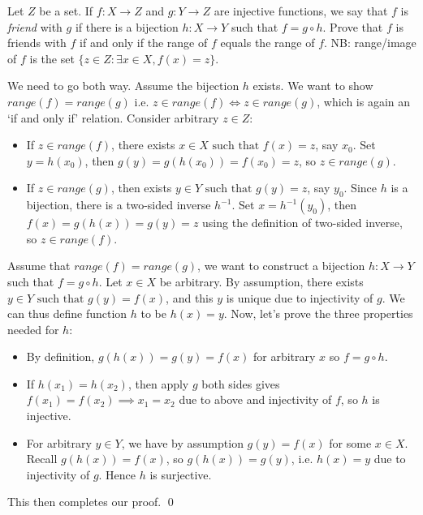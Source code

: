 \documentclass[11pt]{article}
\begin{document}
\begin{problem}
  Let \(Z\) be a set. If \(f : X \to Z\) and \(g : Y \to Z\) are injective functions, we say that \(f\) is \emph{friend} with \(g\) if there is a bijection \(h : X \to Y\) such that \(f = g \circ h\). Prove that \(f\) is friends with \(f\) if and only if the range of \(f\) equals the range of \(f\). NB: range/image of \(f\) is the set \(\{z \in Z : \exists x \in X, f(x) = z\}\).
\end{problem}
\begin{solution}
  We need to go both way.
  \subproof{\(\implies\)}
  Assume the bijection \(h\) exists. We want to show \(range(f)=range(g)\) i.e. \(z \in range(f) \iff z\in range (g)\), which is again an `if and only if' relation. Consider arbitrary \(z \in Z\):
  \begin{itemize}
    \item If \(z\in range(f)\), there exists \(x \in X \text{ such that } f(x)=z\), say \(x_0\). Set \(y=h(x_0)\), then \(g(y)=g(h(x_0))=f(x_0)=z\), so \(z\in range(g)\).
    \item If \(z \in range(g)\), then exists \(y \in Y \text{ such that } g(y)=z\), say \(y_0\). Since \(h\) is a bijection, there is a two-sided inverse \(h^{-1}\). Set \(x=h^{-1}(y_0)\), then \(f(x)=g(h(x))=g(y)=z\) using the definition of two-sided inverse, so \(z \in range(f)\).
  \end{itemize}
  
  \subproof{\(\impliedby\)}
  Assume that \(range(f)=range(g)\), we want to construct a bijection \(h:X\to Y\) such that \(f = g\circ h\). Let \(x \in X\) be arbitrary. By assumption, there exists \(y \in Y \text{ such that } g(y)=f(x)\), and this \(y\) is unique due to injectivity of \(g\). We can thus define function \(h\) to be \(h(x)=y\). Now, let's prove the three properties needed for \(h\):
  \begin{itemize}
    \item By definition, \(g(h(x))=g(y)=f(x)\) for arbitrary \(x\) so \(f = g\circ h\).
    \item If \(h(x_1)=h(x_2)\), then apply \(g\) both sides gives \(f(x_1)=f(x_2) \implies x_1=x_2\) due to above and injectivity of \(f\), so \(h\) is injective.
    \item For arbitrary \(y \in Y\), we have by assumption \(g(y)=f(x)\) for some \(x \in X\). Recall \(g(h(x))=f(x)\), so \(g(h(x)) = g(y)\), i.e. \(h(x)=y\) due to injectivity of \(g\). Hence \(h\) is surjective.
  \end{itemize}

  \noindent This then completes our proof. \qed
\end{solution}
\end{document}
